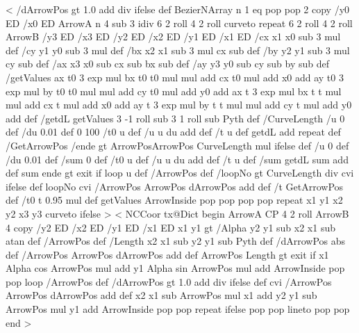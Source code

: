 %
%
<{%
	/dArrowPos  gt {%
		1.0  add div
	}{ \psk@ArrowInsidePos } ifelse def
	BezierNArray
	n 1 eq { pop pop
	}{ 2 copy
		/y0 ED /x0 ED
		ArrowA
		n 4 sub 3 idiv { 6 2 roll 4 2 roll curveto } repeat
		6 2 roll
		4 2 roll
		ArrowB
		/y3 ED /x3 ED /y2 ED /x2 ED /y1 ED /x1 ED
    	/cx x1 x0 sub 3 mul def
		/cy y1 y0 sub 3 mul def
		/bx x2 x1 sub 3 mul cx sub def
		/by y2 y1 sub 3 mul cy sub def
		/ax x3 x0 sub cx sub bx sub def
		/ay y3 y0 sub cy sub by sub def
		/getValues {
			ax t0 3 exp mul bx t0 t0 mul mul add cx t0 mul add x0 add
			ay t0 3 exp mul by t0 t0 mul mul add cy t0 mul add y0 add
			ax t 3 exp mul bx t t mul mul add cx t mul add x0 add
			ay t 3 exp mul by t t mul mul add cy t mul add y0 add
		} def
		/getdL {
			getValues
			3 -1 roll sub 3 1 roll sub Pyth
		} def
		/CurveLength {
			/u 0 def
			/du 0.01 def
			0 100 {
				/t0 u def
				/u u du add def
				/t u def
				getdL add
			} repeat } def
		/GetArrowPos {
			/ende \psk@ArrowInsidePos{} gt {ArrowPos}{ArrowPos CurveLength mul} ifelse def
			/u 0 def
			/du 0.01 def
			/sum 0 def
			{
				/t0 u def
				/u u du add def
		    	/t u def
				/sum getdL sum add def
				sum ende gt {exit} if
			} loop u
		} def
		/ArrowPos \psk@ArrowInsideOffset\space def
		/loopNo \psk@ArrowInsidePos{} gt {%
			CurveLength \psk@ArrowInsidePos\space div cvi
			}{ \psk@ArrowInsideNo } ifelse def
		loopNo cvi {
			/ArrowPos ArrowPos dArrowPos add def
			/t GetArrowPos def
			/t0 t 0.95 mul def
			getValues
			ArrowInside pop pop pop pop
		} repeat
		x1 y1 x2 y2 x3 y3 curveto
	} ifelse
}>
%
<{%
	NCCoor
	tx@Dict begin
	ArrowA CP 4 2 roll ArrowB
	4 copy
	/y2 ED /x2 ED /y1 ED /x1 ED
	x1 y1
	\psk@ArrowInsidePos{} gt{
		/Alpha y2 y1 sub x2 x1 sub atan def
		/ArrowPos \psk@ArrowInsideOffset\space def
		/Length x2 x1 sub y2 y1 sub Pyth def
		/dArrowPos \psk@ArrowInsidePos\space abs def
		{
			/ArrowPos ArrowPos dArrowPos add def
			ArrowPos Length gt { exit } if
			x1 Alpha cos ArrowPos mul add
			y1 Alpha sin ArrowPos mul add
			ArrowInside
			pop pop
		} loop
	}{
		/ArrowPos \psk@ArrowInsideOffset\space def
		/dArrowPos  gt {%
			1.0  add div
		}{ \psk@ArrowInsidePos } ifelse def
		\psk@ArrowInsideNo\space cvi {
			/ArrowPos ArrowPos dArrowPos add def
			x2 x1 sub ArrowPos mul x1 add
			y2 y1 sub ArrowPos mul y1 add
			ArrowInside
			pop pop
		} repeat
	} ifelse
	pop pop lineto pop pop
	end%
}>
